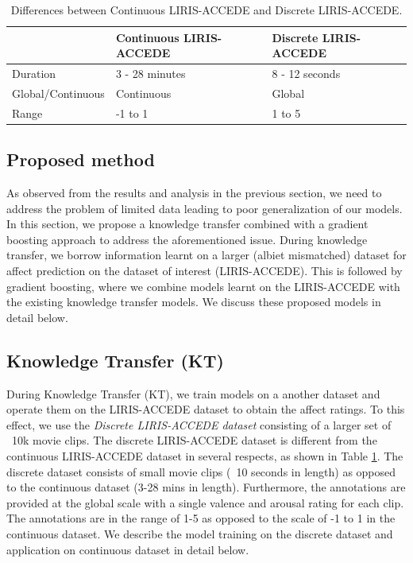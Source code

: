 \documentclass{article}
\begin{document}
\begin{table}[t]
\centering
\begin{tabular}{|l|p{2.2cm}|p{2.2cm}|}
\hline
				& Continuous LIRIS-ACCEDE	& Discrete LIRIS-ACCEDE \\ \hline
Duration			& 3 - 28 minutes			& 8 - 12 seconds		\\ \hline	
Global/Continuous	& Continuous				& Global 				\\ \hline
Range			& -1 to 1					& 1 to 5				\\ \hline
\end{tabular}
\caption{Differences between Continuous LIRIS-ACCEDE and Discrete LIRIS-ACCEDE.}
\label{differences}
\end{table}

\subsection{Proposed method}
As observed from the results and analysis in the previous section, we need to address the problem of limited data leading to poor generalization of our models.
In this section, we propose a knowledge transfer combined with a gradient boosting approach to address the aforementioned issue.
During knowledge transfer, we borrow information learnt on a larger (albiet mismatched) dataset for affect prediction on the dataset of interest (LIRIS-ACCEDE).
This is followed by gradient boosting, where we combine models learnt on the LIRIS-ACCEDE with the existing knowledge transfer models.
We discuss these proposed models in detail below. 

\subsection{Knowledge Transfer (KT)}
During Knowledge Transfer (KT), we train models on a another dataset and operate them on the LIRIS-ACCEDE dataset to obtain the affect ratings.
To this effect, we use the {\it Discrete LIRIS-ACCEDE dataset} consisting of a larger set of ~10k movie clips.  
The discrete LIRIS-ACCEDE dataset is different from the continuous LIRIS-ACCEDE dataset in several respects, as shown in Table \ref{differences}.
The discrete dataset consists of small movie clips (~10 seconds in length) as opposed to the continuous dataset (3-28 mins in length).
Furthermore, the annotations are provided at the global scale with a single valence and arousal rating for each clip.
The annotations are in the range of 1-5 as opposed to the scale of -1 to 1 in the continuous dataset. 
We describe the model training on the discrete dataset and application on continuous dataset in detail below.
\end{document}
